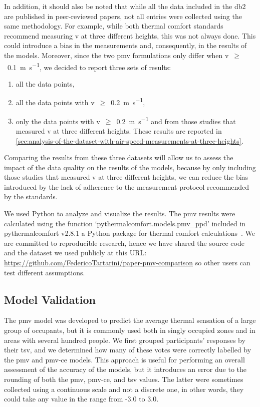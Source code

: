 In addition, it should also be noted that while all the data included in the \ac{db2} are published in peer-reviewed papers, not all entries were collected using the same methodology.
For example, while both thermal comfort standards recommend measuring \ac{v} at three different heights, this was not always done.
This could introduce a bias in the measurements and, consequently, in the results of the models.
Moreover, since the two \ac{pmv} formulations only differ when \ac{v}~$\geq$~\qty{0.1}{\m\per\s}, we decided to report three sets of results:
\begin{enumerate}
    \item all the data points,
    \item all the data points with \ac{v}~$\geq$~\qty{0.2}{\m\per\s},
    \item only the data points with \ac{v}~$\geq$~\qty{0.2}{\m\per\s} and from those studies that measured \ac{v} at three different heights.
    These results are reported in \ref{sec:analysis-of-the-dataset-with-air-speed-measurements-at-three-heights}.
\end{enumerate}
Comparing the results from these three datasets will allow us to assess the impact of the data quality on the results of the models, because by only including those studies that measured \ac{v} at three different heights, we can reduce the bias introduced by the lack of adherence to the measurement protocol recommended by the standards.

We used Python to analyze and visualize the results.
The \ac{pmv} results were calculated using the function `pythermalcomfort.models.pmv\_ppd' included in pythermalcomfort v2.8.1 a Python package for thermal comfort calculations~\cite{Tartarini2020a}.
We are committed to reproducible research, hence we have shared the source code and the dataset we used publicly at this URL: \url{https://github.com/FedericoTartarini/paper-pmv-comparison} so other users can test different assumptions.

\subsection{Model Validation}\label{subsec:model-validation}
The \ac{pmv} model was developed to predict the average thermal sensation of a large group of occupants, but it is commonly used both in singly occupied zones and in areas with several hundred people.
We first grouped participants' responses by their \ac{tsv}, and we determined how many of these votes were correctly labelled by the \ac{pmv} and \ac{pmv-ce} models.
This approach is useful for performing an overall assessment of the accuracy of the models, but it introduces an error due to the rounding of both the \ac{pmv}, \ac{pmv-ce}, and \ac{tsv} values.
The latter were sometimes collected using a continuous scale and not a discrete one, in other words, they could take any value in the range from -3.0 to 3.0.

